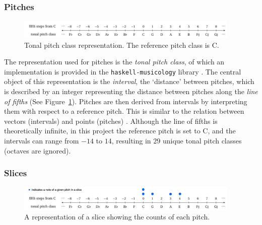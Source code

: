 \documentclass[12pt,a4paper,twoside,openany]{report} \usepackage[pdfborder={0 0 0}]{hyperref}    %
\theoremstyle{definition} \newtheorem{definition}{Definition}[section]
\begin{document}
\subsubsection{Pitches}
\label{sub:pitches}

\begin{figure}[ht]
  \begin{center}
    \includegraphics[width=0.95\textwidth]{figs/intro/tpc.png}
  \end{center}
  \caption{Tonal pitch class representation. The reference pitch class is C.}
  \label{fig:tpc}
\end{figure}
The representation used for pitches is the \textit{tonal pitch class}, of which an implementation is provided in the
\texttt{haskell-musicology} library \cite{finkensiepHaskellmusicologyScientificMusic2019}. The central object of this
representation is the \textit{interval}, the `distance' between pitches, which is described by an integer representing the distance between pitches
along the \textit{line of fifths} (See Figure~\ref{fig:tpc}). Pitches are then derived from intervals by interpreting them with respect to a reference pitch.
This is similar to the relation between vectors (intervals) and points (pitches)
\cite{finkensiepHaskellmusicologyScientificMusic2019}. Although the line of fifths is theoretically infinite, in this
project the reference pitch is set to C, and the intervals can range from $-14$ to $14$, resulting in $29$ unique tonal pitch
classes (octaves are ignored).

\subsubsection{Slices}
\label{sub:slices}

\begin{figure}[ht]
  \begin{center}
    \includegraphics[width=0.95\textwidth]{figs/prep/inferringHarmony/sliceRep/cMaj.png}
  \end{center}
  \caption{A representation of a slice showing the counts of each pitch.}
  \label{fig:slices}
\end{figure}
\end{document}
